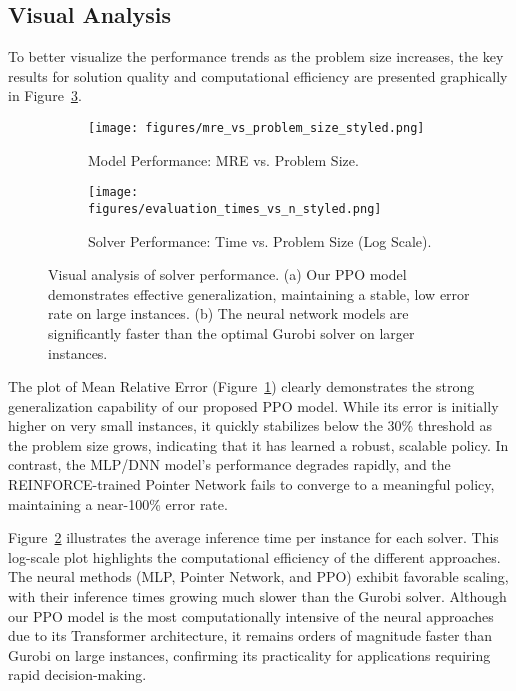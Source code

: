
\subsection{Visual Analysis}
To better visualize the performance trends as the problem size increases, the key results for solution quality and computational efficiency are presented graphically in Figure~\ref{fig:visual_results}.

\begin{figure}[htbp]
    \centering

    \begin{subfigure}{\textwidth}
        \centering
        \texttt{[image: figures/mre\_vs\_problem\_size\_styled.png]}
        \caption{Model Performance: MRE vs. Problem Size.}
        \label{fig:mre_vs_size}
    \end{subfigure}

    \vspace{1em} %

    \begin{subfigure}{\textwidth}
        \centering
        \texttt{[image: figures/evaluation\_times\_vs\_n\_styled.png]}
        \caption{Solver Performance: Time vs. Problem Size (Log Scale).}
        \label{fig:time_vs_size}
    \end{subfigure}
    
    \caption{Visual analysis of solver performance. (a) Our PPO model demonstrates effective generalization, maintaining a stable, low error rate on large instances. (b) The neural network models are significantly faster than the optimal Gurobi solver on larger instances.}
    \label{fig:visual_results}
\end{figure}

The plot of Mean Relative Error (Figure~\ref{fig:mre_vs_size}) clearly demonstrates the strong generalization capability of our proposed PPO model. While its error is initially higher on very small instances, it quickly stabilizes below the 30\% threshold as the problem size grows, indicating that it has learned a robust, scalable policy. In contrast, the MLP/DNN model's performance degrades rapidly, and the REINFORCE-trained Pointer Network fails to converge to a meaningful policy, maintaining a near-100\% error rate.

Figure~\ref{fig:time_vs_size} illustrates the average inference time per instance for each solver. This log-scale plot highlights the computational efficiency of the different approaches. The neural methods (MLP, Pointer Network, and PPO) exhibit favorable scaling, with their inference times growing much slower than the Gurobi solver. Although our PPO model is the most computationally intensive of the neural approaches due to its Transformer architecture, it remains orders of magnitude faster than Gurobi on large instances, confirming its practicality for applications requiring rapid decision-making.
